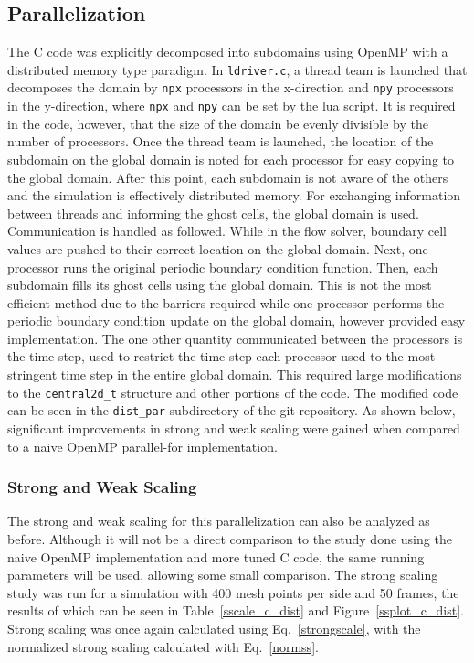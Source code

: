 \documentclass[12pt]{article}
\begin{document}
\subsection{Parallelization}
The C code was explicitly decomposed into subdomains using OpenMP with a distributed memory type paradigm. In \texttt{ldriver.c}, a thread team is launched that decomposes the domain by \texttt{npx} processors in the x-direction and \texttt{npy} processors in the y-direction, where \texttt{npx} and \texttt{npy} can be set by the lua script. It is required in the code, however, that the size of the domain be evenly divisible by the number of processors. Once the thread team is launched, the location of the subdomain on the global domain is noted for each processor for easy copying to the global domain. After this point, each subdomain is not aware of the others and the simulation is effectively distributed memory. For exchanging information between threads and informing the ghost cells, the global domain is used. Communication is handled as followed. While in the flow solver, boundary cell values are pushed to their correct location on the global domain. Next, one processor runs the original periodic boundary condition function. Then, each subdomain fills its ghost cells using the global domain. This is not the most efficient method due to the barriers required while one processor performs the periodic boundary condition update on the global domain, however provided easy implementation. The one other quantity communicated between the processors is the time step, used to restrict the time step each processor used to the most stringent time step in the entire global domain. This required large modifications to the \texttt{central2d\_t} structure and other portions of the code. The modified code can be seen in the \texttt{dist\_par} subdirectory of the git repository. As shown below, significant improvements in strong and weak scaling were gained when compared to a naive OpenMP parallel-for implementation.

\subsubsection{Strong and Weak Scaling}
The strong and weak scaling for this parallelization can also be analyzed as before. Although it will not be a direct comparison to the study done using the naive OpenMP implementation and more tuned C code, the same running parameters will be used, allowing some small comparison. The strong scaling study was run for a simulation with 400 mesh points per side and 50 frames, the results of which can be seen in Table~\ref{sscale_c_dist} and Figure~\ref{ssplot_c_dist}. Strong scaling was once again calculated using Eq.~\ref{strongscale}, with the normalized strong scaling calculated with Eq.~\ref{normss}.
\end{document}
